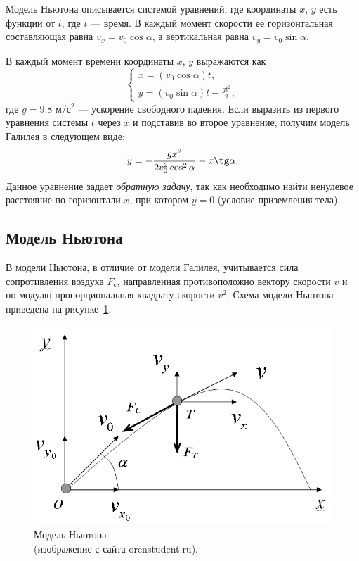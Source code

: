 \documentclass[14pt,russian]{extarticle}
\begin{document}
Модель Ньютона описывается системой уравнений, где координаты $x$, $y$ есть функции от $t$, где $t$ --- время.
В каждый момент скорости ее горизонтальная составляющая равна $v_x = v_0 \cos \alpha$, а вертикальная равна $v_y = v_0 \sin \alpha$.

В каждый момент времени координаты $x$, $y$ выражаются как
$$
\begin{cases}
x = (v_0 \cos \alpha) t, \\
y = (v_0 \sin \alpha) t - \frac{g t^2}{2},
\end{cases}
$$
где $g = 9.8$ м/с$^2$ --- ускорение свободного падения. Если выразить из первого уравнения системы $t$ через $x$ и подставив во второе уравнение, получим модель Галилея в следующем виде:
$$y = - \frac{g x^2}{2 v_0^2 \cos^2 \alpha} - x \tg \alpha.$$
Данное уравнение задает \textit{обратную задачу}, так как необходимо найти ненулевое расстояние по горизонтали $x$, при котором $y = 0$ (условие приземления тела).

\subsection{Модель Ньютона}
В модели Ньютона, в отличие от модели Галилея, учитывается сила сопротивления воздуха $F_с$, направленная противоположно вектору скорости $v$ и по модулю пропорциональная квадрату скорости $v^2$. Схема модели Ньютона приведена на рисунке~\ref{img:newton_model}.
\begin{figure}[h!]
	\centering
		\includegraphics[width=1\linewidth]{img/newton_model.jpg}
	\caption{Модель Ньютона\\(изображение с сайта orenstudent.ru).}
	\label{img:newton_model}
\end{figure}
\end{document}
